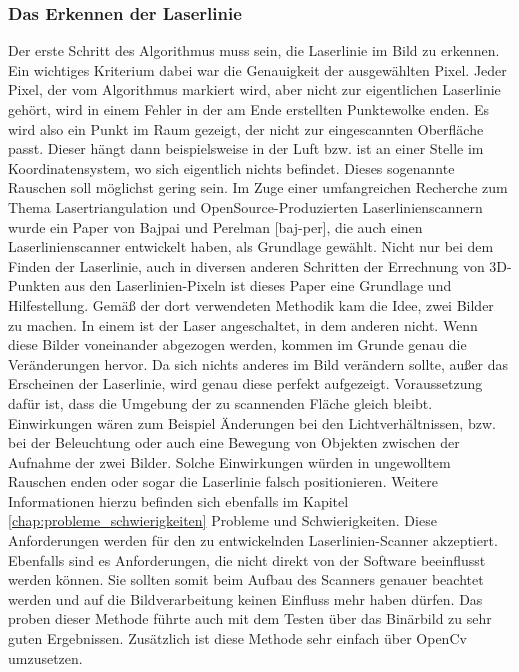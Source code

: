 	\label{chap:bildverarbeitung}
	\subsubsection{Das Erkennen der Laserlinie}
	Der erste Schritt des Algorithmus muss sein, die Laserlinie im Bild zu erkennen. Ein wichtiges Kriterium dabei war die Genauigkeit der ausgewählten Pixel. Jeder Pixel, der vom Algorithmus markiert wird, aber nicht zur eigentlichen Laserlinie gehört, wird in einem Fehler in der am Ende erstellten Punktewolke enden. Es wird also ein Punkt im Raum gezeigt, der nicht zur eingescannten Oberfläche passt. Dieser hängt dann beispielsweise in der Luft bzw. ist an einer Stelle im Koordinatensystem, wo sich eigentlich nichts befindet. Dieses sogenannte Rauschen soll möglichst gering sein. \newline
	Im Zuge einer umfangreichen Recherche zum Thema Lasertriangulation und OpenSource-Produzierten Laserlinienscannern wurde ein Paper von Bajpai und Perelman [baj-per], die auch einen Laserlinienscanner entwickelt haben, als Grundlage gewählt. Nicht nur bei dem Finden der Laserlinie, auch in diversen anderen Schritten der Errechnung von 3D-Punkten aus den Laserlinien-Pixeln ist dieses Paper eine Grundlage und Hilfestellung. Gemäß der dort verwendeten Methodik kam die Idee, zwei Bilder zu machen. In einem ist der Laser angeschaltet, in dem anderen nicht. Wenn diese Bilder voneinander abgezogen werden, kommen im Grunde genau die Veränderungen hervor. Da sich nichts anderes im Bild verändern sollte, außer das Erscheinen der Laserlinie, wird genau diese perfekt aufgezeigt.
	Voraussetzung dafür ist, dass die Umgebung der zu scannenden Fläche gleich bleibt. Einwirkungen wären zum Beispiel Änderungen bei den Lichtverhältnissen, bzw. bei der Beleuchtung oder auch eine Bewegung von Objekten zwischen der Aufnahme der zwei Bilder. Solche Einwirkungen würden in ungewolltem Rauschen enden oder sogar die Laserlinie falsch positionieren. Weitere Informationen hierzu befinden sich ebenfalls im Kapitel \ref{chap:probleme_schwierigkeiten} Probleme und Schwierigkeiten. Diese Anforderungen werden für den zu entwickelnden Laserlinien-Scanner akzeptiert. Ebenfalls sind es Anforderungen, die nicht direkt von der Software beeinflusst werden können. Sie sollten somit beim Aufbau des Scanners genauer beachtet werden und auf die Bildverarbeitung keinen Einfluss mehr haben dürfen. Das proben dieser Methode führte auch mit dem Testen über das Binärbild zu sehr guten Ergebnissen. Zusätzlich ist diese Methode sehr einfach über OpenCv umzusetzen.
	
